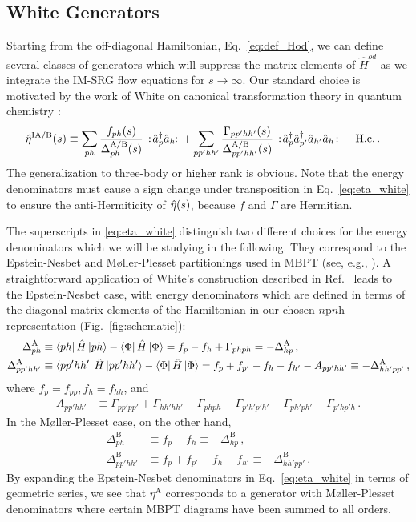 \subsection{\label{sec:white}White Generators}
Starting from the off-diagonal Hamiltonian, Eq.~\eqref{eq:def_Hod}, we can define several classes of generators which will suppress the matrix elements of $\hat{H}^{od}$ as we integrate the IM-SRG flow equations for $s\to\infty$. Our standard choice is motivated by the work of White on canonical transformation theory in quantum chemistry \cite{White:2002fk,Tsukiyama:2011uq}:
\begin{align}
  \etaO^\text{IA/B}(s)
  &\equiv\sum_{ph}\frac{f_{ph}(s)}{\Delta^\text{A/B}_{ph}(s)}\nord{\aaO_{p}\aO_{h}\!}
  +\sum_{pp'hh'}\frac{\Gamma_{pp'hh'}(s)}{\Delta^\text{A/B}_{pp'hh'}(s)}\nord{\aaO_{p}\aaO_{p'}\aO_{h'}\aO_{h}}-\;\text{H.c.}\,.\label{eq:eta_white}
\end{align}
The generalization to three-body or higher rank is obvious. Note that the energy denominators must cause a sign change under transposition in Eq.~\eqref{eq:eta_white} to ensure the anti-Hermiticity of $\hat{\eta}(s)$, because $f$ and $\Gamma$ are Hermitian.

The superscripts in \eqref{eq:eta_white} distinguish two different choices for the energy denominators which we will be studying in the following. They correspond to the Epstein-Nesbet and M{\o}ller-Plesset partitionings used in MBPT (see, e.g., \cite{Shavitt:2009}). A straightforward application of White's construction described in Ref.~\cite{White:2002fk} leads to the Epstein-Nesbet case, with energy denominators which are defined in terms of the diagonal matrix elements of the Hamiltonian in our chosen $n$p$n$h-representation (Fig.~\ref{fig:schematic}):
\begin{align}
  \Delta^\text{A}_{ph} &\equiv \matrixe{ph}{\hat{H}}{ph} - \matrixe{\Phi}{\hat{H}}{\Phi}
                  = f_p - f_h + \Gamma_{phph} = - \Delta^\text{A}_{hp} \,,\label{eq:eden1b_en}\\  
  \Delta^\text{A}_{pp'hh'} &\equiv \matrixe{pp'hh'}{\hat{H}}{pp'hh'} - \matrixe{\Phi}{\hat{H}}{\Phi}
                  = f_p + f_{p'} - f_h - f_{h'} - A_{pp'hh'} \equiv - \Delta^\text{A}_{hh'pp'} \,,\label{eq:eden2b_en}
\end{align}
where $f_{p}=f_{pp}, f_{h}=f_{hh}$, and
\begin{align}
  A_{pp'hh'}&\equiv\Gamma_{pp'pp'}+\Gamma_{hh'hh'}-\Gamma_{phph}
       -\Gamma_{p'h'p'h'}-\Gamma_{ph'ph'}-\Gamma_{p'hp'h}\,.\label{eq:def_A}
\end{align}
In the M{\o}ller-Plesset case, on the other hand, 
\begin{align}
  \Delta^\text{B}_{ph}     &\equiv f_p - f_h \equiv - \Delta^\text{B}_{hp} \,, \label{eq:eden1b_mp}\\  
  \Delta^\text{B}_{pp'hh'} &\equiv f_p + f_{p'} - f_h - f_{h'} \equiv - \Delta^\text{B}_{hh'pp'}\,.\label{eq:eden2b_mp}
\end{align}
By expanding the Epstein-Nesbet denominators in Eq.~\eqref{eq:eta_white} in terms of geometric series, we see that $\eta^\text{A}$ corresponds to a generator with M{\o}ller-Plesset denominators where certain MBPT diagrams have been summed to all orders.

